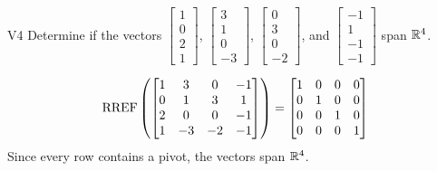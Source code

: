 \begin{problem}{V4}
Determine if the vectors \(\begin{bmatrix} 1 \\ 0 \\ 2 \\1 \end{bmatrix}\), \(\begin{bmatrix} 3 \\ 1 \\ 0 \\ -3 \end{bmatrix}\), \(\begin{bmatrix} 0 \\ 3 \\ 0 \\ -2 \end{bmatrix}\), and \(\begin{bmatrix}-1 \\ 1 \\ -1 \\ -1 \end{bmatrix}\) span \(\mathbb{R}^4\).
\end{problem}
\begin{solution}
\[\operatorname{RREF}\left(\begin{bmatrix}1 & 3 & 0 & -1 \\ 0 & 1 & 3 & 1 \\ 2 & 0 & 0 & -1 \\ 1 & -3 & -2 & -1 \end{bmatrix} \right) =\begin{bmatrix} 1 & 0 & 0 & 0 \\ 0 & 1 & 0 & 0 \\ 0 & 0 & 1 & 0 \\ 0 & 0 & 0 & 1 \end{bmatrix}\]
Since every row contains a pivot, the vectors span \(\mathbb{R}^4\).
\end{solution}

